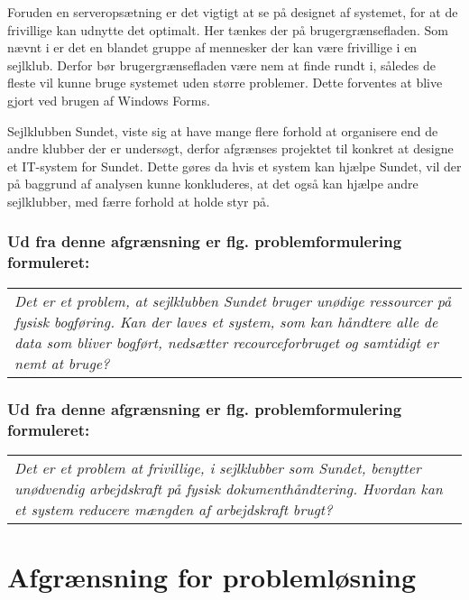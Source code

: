 Foruden en serveropsætning er det vigtigt at se på designet af systemet, for at de frivillige kan udnytte det
optimalt. Her tænkes der på brugergrænsefladen. Som nævnt i 
er det en blandet gruppe af mennesker der kan være frivillige i en sejlklub. Derfor bør brugergrænsefladen
være nem at finde rundt i, således de fleste vil kunne bruge systemet uden større problemer. Dette
forventes at blive gjort ved brugen af Windows Forms.

Sejlklubben Sundet, viste sig at have mange flere forhold at organisere end de andre klubber der er undersøgt,
derfor afgrænses projektet til konkret at designe et IT-system for Sundet. Dette gøres da hvis et system kan
hjælpe Sundet, vil der på baggrund af analysen kunne konkluderes, at det også kan hjælpe andre sejlklubber,
med færre forhold at holde styr på.

\subsubsection*{Ud fra denne afgrænsning er flg. problemformulering formuleret:}

\begin{center}
  \begin{tabular}{|p{14cm}|}
    \textit{Det er et problem, at sejlklubben Sundet bruger unødige ressourcer på fysisk bogføring. Kan der
    laves et system, som kan håndtere alle de data som bliver bogført, nedsætter recourceforbruget og
    samtidigt er nemt at bruge? }
  \end{tabular}
\end{center}

\subsubsection*{Ud fra denne afgrænsning er flg. problemformulering formuleret:}

\begin{center}
  \begin{tabular}{|p{14cm}|}
    \textit{Det er et problem at frivillige, i sejlklubber som Sundet, benytter unødvendig arbejdskraft på
    fysisk dokumenthåndtering. Hvordan kan et system reducere mængden af arbejdskraft brugt? }
  \end{tabular}
\end{center}


\section{Afgrænsning for problemløsning}

